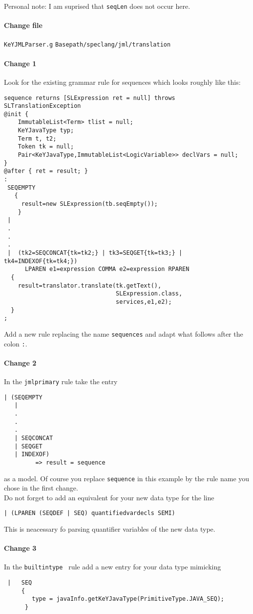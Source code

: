 \documentclass[11pt]{article}
\begin{document}
Personal note: I am suprised that \verb+seqLen+ does not occur here.
\paragraph{Change file}  \verb+KeYJMLParser.g+ \verb+Basepath/speclang/jml/translation+\\
\paragraph{\quad Change 1}
Look for the existing grammar rule for sequences which looks roughly like this:
\begin{verbatim}
sequence returns [SLExpression ret = null] throws SLTranslationException
@init {
    ImmutableList<Term> tlist = null;
    KeYJavaType typ;
    Term t, t2;
    Token tk = null;
    Pair<KeYJavaType,ImmutableList<LogicVariable>> declVars = null;
}
@after { ret = result; }
:
 SEQEMPTY
   {
     result=new SLExpression(tb.seqEmpty());
    }
 |  
 .
 .
 .        
 |  (tk2=SEQCONCAT{tk=tk2;} | tk3=SEQGET{tk=tk3;} | tk4=INDEXOF{tk=tk4;})
      LPAREN e1=expression COMMA e2=expression RPAREN
  {
    result=translator.translate(tk.getText(),
                                SLExpression.class,
                                services,e1,e2);
  }
;
\end{verbatim}
Add a new rule replacing the name \verb+sequences+ and adapt what follows after the colon \verb+:+.
\paragraph{\quad Change 2} In the \verb+jmlprimary+ rule take the entry
\begin{verbatim}
| (SEQEMPTY
   |
   .
   .
   .
   | SEQCONCAT
   | SEQGET
   | INDEXOF)
         => result = sequence    
\end{verbatim}
as a model. Of course you replace \verb+sequence+ in this example by the rule name you chose in the first change.
\\
Do not forget to  add an equivalent for your new data type for the line 
\begin{verbatim}
| (LPAREN (SEQDEF | SEQ) quantifiedvardecls SEMI)
\end{verbatim}
This is neacessary fo parsing quantifier variables of the new data type.
\paragraph{\quad Change 3} In the \verb+builtintype + rule add a new entry for your data type mimicking
\begin{verbatim}
 |   SEQ
     {
        type = javaInfo.getKeYJavaType(PrimitiveType.JAVA_SEQ);
      }
\end{verbatim}
\end{document}
